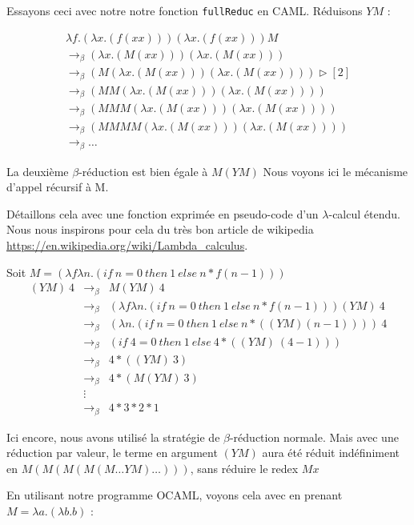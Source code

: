 Essayons ceci avec notre notre fonction \verb+fullReduc+  en CAML.
Réduisons $YM$ :

$$
\begin{array}{l}
\lambda f . (\lambda x . (f (x x))) (\lambda x . (f (x x))) M \\
\rightarrow _\beta (\lambda x . (M (xx)))(\lambda x . (M(xx))) \\
\rightarrow _\beta  (M(\lambda x . (M(xx)))(\lambda x . (M(xx))))  \triangleright [2] \\
\rightarrow _\beta  (MM(\lambda x . (M(xx)))(\lambda x . (M(xx)))) \\
\rightarrow _\beta  (MMM(\lambda x . (M(xx)))(\lambda x . (M(xx)))) \\
\rightarrow _\beta  (MMMM(\lambda x . (M(xx)))(\lambda x . (M(xx)))) \\
\rightarrow _\beta  \ldots
\end{array}
$$


La deuxième $\beta$-r\'{e}duction est bien \'{e}gale \`{a} $M (Y M)$
Nous voyons ici le mécanisme d'appel récursif à M. 

Détaillons cela avec une fonction exprimée en pseudo-code d'un $\lambda$-calcul étendu.
Nous nous inspirons pour cela du très bon article de wikipedia \url{https://en.wikipedia.org/wiki/Lambda_calculus}.


Soit $M = (\lambda f \lambda n .(if\ n=0\ then\ 1\ else\ n*f(n-1)))$
$$
\begin{array}{lll}
(YM)\ 4 & \rightarrow _\beta & M (YM)\ 4 \\
& \rightarrow _\beta & (\lambda f \lambda n .(if\ n=0\ then\ 1\ else\ n*f(n-1))) (YM)\ 4 \\
& \rightarrow _\beta & (\lambda  n . (if\ n=0\ then\ 1\ else\ n*((YM) (n-1))))\ 4 \\
& \rightarrow _\beta & (if\ 4=0\ then\ 1\ else\ 4*((YM)\ (4-1))) \\
& \rightarrow _\beta & 4 * ((YM)\ 3) \\
& \rightarrow _\beta & 4 * (M(YM)\ 3) \\
& \vdots & \\
& \rightarrow _\beta & 4 * 3 * 2 * 1 
\end{array}
$$

Ici encore, nous avons utilisé la stratégie de $\beta$-réduction normale. 
Mais avec une réduction par valeur, le terme en argument $(YM)$ aura été réduit indéfiniment en $M(M(M(M(M\ldots YM)\ldots)))$,
sans réduire le redex $Mx$


En utilisant notre programme OCAML, voyons cela avec en prenant $M = \lambda a. (\lambda b . b) $ :

